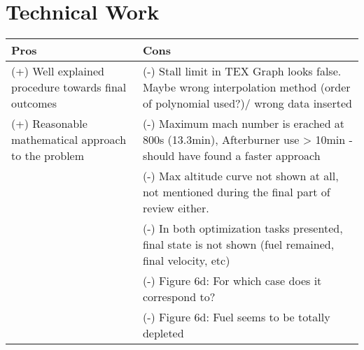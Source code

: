 \section{Technical Work}


\begin{table}[H]
  \centering
    \begin{tabular}{p{7cm}|p{7cm}}
    \toprule
    \textbf{Pros}  & \textbf{Cons} \\    \midrule
    (+) Well explained procedure towards final outcomes & (-) Stall limit in TEX Graph looks false. Maybe wrong interpolation method (order of polynomial used?)/ wrong data inserted  \\
    (+) Reasonable mathematical approach to the problem & (-) Maximum mach number is erached at 800s (13.3min), Afterburner use > 10min - should have found a faster approach \\
          & (-) Max altitude curve not shown at all, not  mentioned during the final part of review either. \\
          & (-) In both optimization tasks presented, final state is not shown (fuel remained, final velocity, etc) \\
          & (-) Figure 6d: For which case does it correspond to?  \\
          & (-) Figure 6d: Fuel seems to be totally depleted \\
    \bottomrule
    \end{tabular}%
\end{table}%
